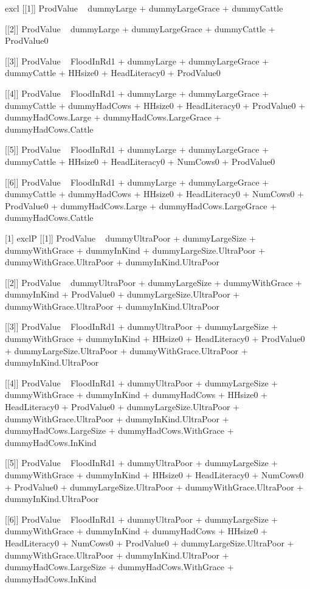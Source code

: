 \begin{Schunk}
\begin{Soutput}
[1] excl
[[1]]
ProdValue ~ dummyLarge + dummyLargeGrace + dummyCattle

[[2]]
ProdValue ~ dummyLarge + dummyLargeGrace + dummyCattle + ProdValue0

[[3]]
ProdValue ~ FloodInRd1 + dummyLarge + dummyLargeGrace + dummyCattle + 
    HHsize0 + HeadLiteracy0 + ProdValue0

[[4]]
ProdValue ~ FloodInRd1 + dummyLarge + dummyLargeGrace + dummyCattle + 
    dummyHadCows + HHsize0 + HeadLiteracy0 + ProdValue0 + dummyHadCows.Large + 
    dummyHadCows.LargeGrace + dummyHadCows.Cattle

[[5]]
ProdValue ~ FloodInRd1 + dummyLarge + dummyLargeGrace + dummyCattle + 
    HHsize0 + HeadLiteracy0 + NumCows0 + ProdValue0

[[6]]
ProdValue ~ FloodInRd1 + dummyLarge + dummyLargeGrace + dummyCattle + 
    dummyHadCows + HHsize0 + HeadLiteracy0 + NumCows0 + ProdValue0 + 
    dummyHadCows.Large + dummyHadCows.LargeGrace + dummyHadCows.Cattle

[1] exclP
[[1]]
ProdValue ~ dummyUltraPoor + dummyLargeSize + dummyWithGrace + 
    dummyInKind + dummyLargeSize.UltraPoor + dummyWithGrace.UltraPoor + 
    dummyInKind.UltraPoor

[[2]]
ProdValue ~ dummyUltraPoor + dummyLargeSize + dummyWithGrace + 
    dummyInKind + ProdValue0 + dummyLargeSize.UltraPoor + dummyWithGrace.UltraPoor + 
    dummyInKind.UltraPoor

[[3]]
ProdValue ~ FloodInRd1 + dummyUltraPoor + dummyLargeSize + dummyWithGrace + 
    dummyInKind + HHsize0 + HeadLiteracy0 + ProdValue0 + dummyLargeSize.UltraPoor + 
    dummyWithGrace.UltraPoor + dummyInKind.UltraPoor

[[4]]
ProdValue ~ FloodInRd1 + dummyUltraPoor + dummyLargeSize + dummyWithGrace + 
    dummyInKind + dummyHadCows + HHsize0 + HeadLiteracy0 + ProdValue0 + 
    dummyLargeSize.UltraPoor + dummyWithGrace.UltraPoor + dummyInKind.UltraPoor + 
    dummyHadCows.LargeSize + dummyHadCows.WithGrace + dummyHadCows.InKind

[[5]]
ProdValue ~ FloodInRd1 + dummyUltraPoor + dummyLargeSize + dummyWithGrace + 
    dummyInKind + HHsize0 + HeadLiteracy0 + NumCows0 + ProdValue0 + 
    dummyLargeSize.UltraPoor + dummyWithGrace.UltraPoor + dummyInKind.UltraPoor

[[6]]
ProdValue ~ FloodInRd1 + dummyUltraPoor + dummyLargeSize + dummyWithGrace + 
    dummyInKind + dummyHadCows + HHsize0 + HeadLiteracy0 + NumCows0 + 
    ProdValue0 + dummyLargeSize.UltraPoor + dummyWithGrace.UltraPoor + 
    dummyInKind.UltraPoor + dummyHadCows.LargeSize + dummyHadCows.WithGrace + 
    dummyHadCows.InKind


\end{Soutput}
\end{Schunk}
